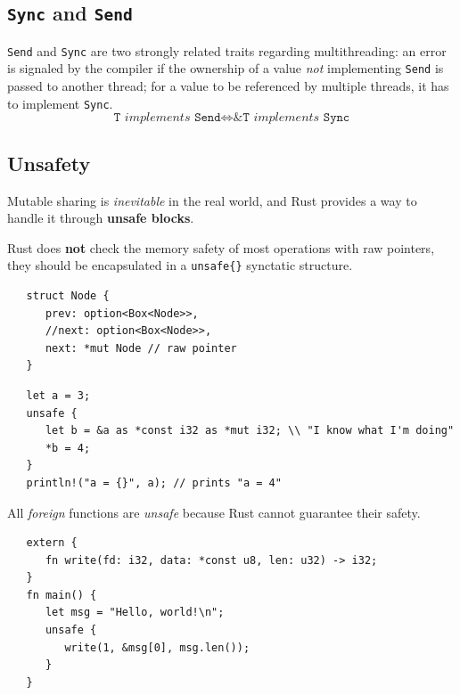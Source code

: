 \subsection{\texttt{Sync} and \texttt{Send}}
\lstinline|Send| and \lstinline|Sync| are two strongly related traits regarding multithreading: 
an error is signaled by the compiler if the ownership of
a value \textit{not} implementing \lstinline|Send| is passed to another thread;
for a value to be referenced by multiple threads, it has to
implement \lstinline|Sync|.
\begin{equation}
   \texttt{T} \textit{ implements } \texttt{Send} \Leftrightarrow \texttt{\&T} \textit{ implements } \texttt{Sync}
\end{equation}

\subsection{Unsafety}
Mutable sharing is \textit{inevitable} in the real world, and Rust provides a way to handle it through \textbf{unsafe blocks}.

Rust does \textbf{not} check the memory safety of most operations with raw pointers, they should be encapsulated in a \lstinline|unsafe{}| synctatic structure.
\begin{lstlisting}
   struct Node {
      prev: option<Box<Node>>,
      //next: option<Box<Node>>,
      next: *mut Node // raw pointer
   }
\end{lstlisting}

\begin{lstlisting}
   let a = 3;
   unsafe {
      let b = &a as *const i32 as *mut i32; \\ "I know what I'm doing"
      *b = 4;
   }
   println!("a = {}", a); // prints "a = 4"
\end{lstlisting}

All \textit{foreign} functions are \textit{unsafe} because Rust cannot guarantee their safety.

\begin{lstlisting}
   extern {
      fn write(fd: i32, data: *const u8, len: u32) -> i32;
   }
   fn main() {
      let msg = "Hello, world!\n";
      unsafe {
         write(1, &msg[0], msg.len());
      }
   }
\end{lstlisting}